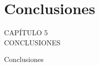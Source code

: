 
{
\Hide
\chapter{Conclusiones}
}

\begin{titular} 
	\uppercase{
	capítulo 5 \\
	Conclusiones \\
	}
\end{titular}

{
	\fontsize{22pt}{26.4pt}%
	\selectfont%
	Conclusiones
}

 


